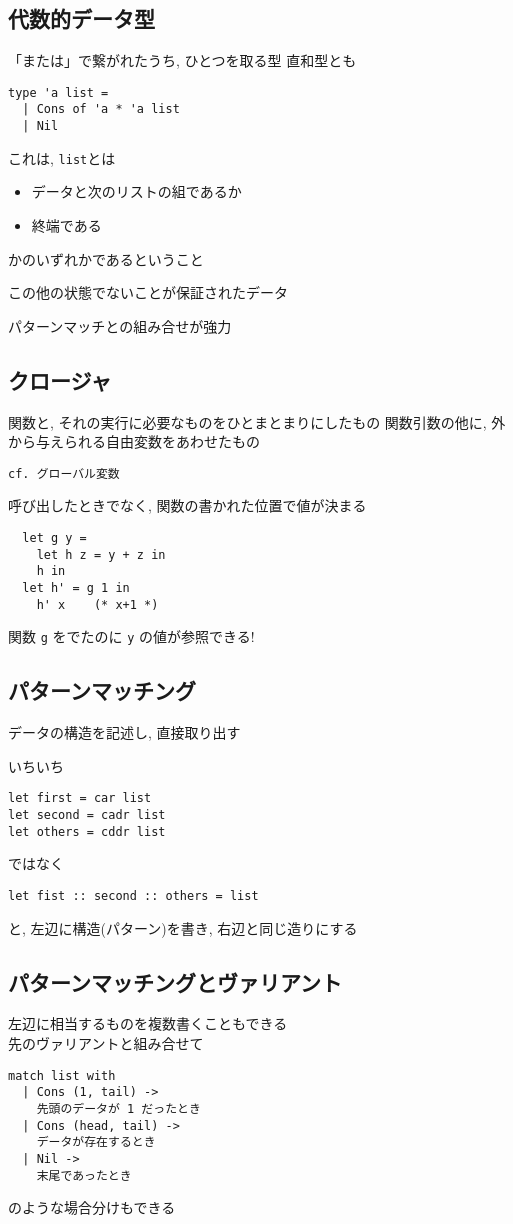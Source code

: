 \documentclass[papersize,30pt,slide]{jsarticle}
\begin{document}
\subsection{代数的データ型}
「または」で繋がれたうち, ひとつを取る型 直和型とも

\begin{verbatim}
type 'a list =
  | Cons of 'a * 'a list
  | Nil
\end{verbatim}
これは, \verb|list|とは
\begin{itemize}
\item データと次のリストの組であるか
\item 終端である
\end{itemize}
かのいずれかであるということ

この他の状態でないことが保証されたデータ

パターンマッチとの組み合せが強力

\newpage
\subsection{クロージャ}
関数と, それの実行に必要なものをひとまとまりにしたもの
関数引数の他に, 外から与えられる自由変数をあわせたもの

\begin{verbatim}
cf. グローバル変数
\end{verbatim}
呼び出したときでなく, 関数の書かれた位置で値が決まる

\begin{verbatim}
  let g y =
    let h z = y + z in
    h in
  let h' = g 1 in
    h' x    (* x+1 *)
\end{verbatim}
関数 \verb|g| をでたのに \verb|y| の値が参照できる!

\newpage
\subsection{パターンマッチング}
データの構造を記述し, 直接取り出す

いちいち
\begin{verbatim}
let first = car list
let second = cadr list
let others = cddr list
\end{verbatim}
ではなく
\begin{verbatim}
let fist :: second :: others = list
\end{verbatim}
と, 左辺に構造(パターン)を書き, 右辺と同じ造りにする

\newpage
\subsection{パターンマッチングとヴァリアント}
左辺に相当するものを複数書くこともできる \\
先のヴァリアントと組み合せて\vspace{-0.9em}
\begin{verbatim}
match list with
  | Cons (1, tail) ->
    先頭のデータが 1 だったとき
  | Cons (head, tail) ->
    データが存在するとき
  | Nil ->
    末尾であったとき
\end{verbatim} \vspace{-0.8em}
のような場合分けもできる
\end{document}
